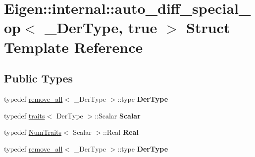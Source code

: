\hypertarget{struct_eigen_1_1internal_1_1auto__diff__special__op_3_01___der_type_00_01true_01_4}{}\section{Eigen\+:\+:internal\+:\+:auto\+\_\+diff\+\_\+special\+\_\+op$<$ \+\_\+\+Der\+Type, true $>$ Struct Template Reference}
\label{struct_eigen_1_1internal_1_1auto__diff__special__op_3_01___der_type_00_01true_01_4}
\subsection*{Public Types}
\begin{DoxyCompactItemize}
\item 
\mbox{\label{struct_eigen_1_1internal_1_1auto__diff__special__op_3_01___der_type_00_01true_01_4_a83d11a8eb67049f0606a12672b5d172a}} 
typedef \hyperlink{struct_eigen_1_1internal_1_1remove__all}{remove\+\_\+all}$<$ \+\_\+\+Der\+Type $>$\+::type {\bfseries Der\+Type}
\item 
\mbox{\label{struct_eigen_1_1internal_1_1auto__diff__special__op_3_01___der_type_00_01true_01_4_abaa12979bdaf69fddebfcffe871eed06}} 
typedef \hyperlink{struct_eigen_1_1internal_1_1traits}{traits}$<$ Der\+Type $>$\+::Scalar {\bfseries Scalar}
\item 
\mbox{\label{struct_eigen_1_1internal_1_1auto__diff__special__op_3_01___der_type_00_01true_01_4_a329d36bdac7cde71a516efa60a76a10e}} 
typedef \hyperlink{group___core___module_struct_eigen_1_1_num_traits}{Num\+Traits}$<$ Scalar $>$\+::Real {\bfseries Real}
\item 
\mbox{\label{struct_eigen_1_1internal_1_1auto__diff__special__op_3_01___der_type_00_01true_01_4_a83d11a8eb67049f0606a12672b5d172a}} 
typedef \hyperlink{struct_eigen_1_1internal_1_1remove__all}{remove\+\_\+all}$<$ \+\_\+\+Der\+Type $>$\+::type {\bfseries Der\+Type}

\end{DoxyCompactItemize}
